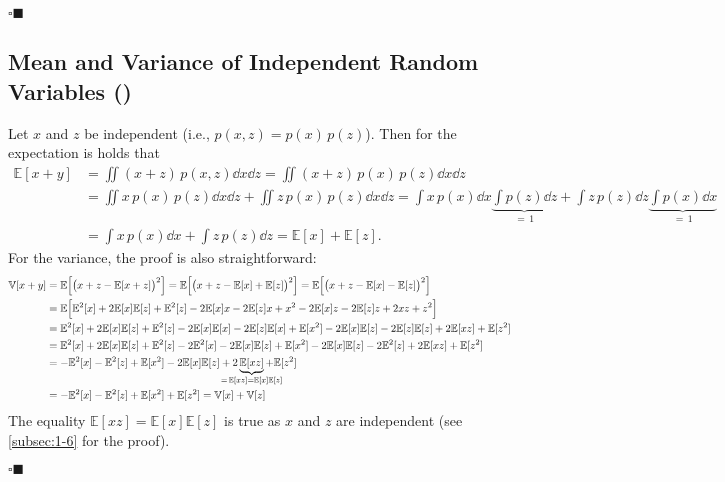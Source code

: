 \documentclass[11pt, a4paper]{scrartcl}
\newcommand{\E}{\mathbb{E}}
\newcommand{\Var}{\mathbb{V}}
\newcommand{\qedeot}{\hfill\(\square\blacksquare\)}
\newcommand{\diffstar}{\texorpdfstring{\raisebox{-1pt}{\resizebox{!}{8pt}{\(\star\)}}}{*}}
\newcommand{\onestar}  {(\diffstar)}
\begin{document}
			\qedeot

		\subsection{Mean and Variance of Independent Random Variables  \onestar}
			Let \(x\) and \(z\) be independent (i.e., \( p(x, z) = p(x) \, p(z) \)). Then for the expectation is holds that
			\begin{align}
				\E[x + y]
					&= \iint\! (x + z) \, p(x, z) \dd{x} \dd{z}
					 = \iint\! (x + z) \, p(x) \, p(z) \dd{x} \dd{z} \\
					&= \iint\! x \, p(x) \, p(z) \dd{x} \dd{z} + \iint\! z \, p(x) \, p(z) \dd{x} \dd{z}
					 = \int\! x \, p(x) \dd{x} \underbrace{\int\! p(z) \dd{z}}_{=\, 1} + \int\! z \, p(z) \dd{z} \underbrace{\int\! p(x) \dd{x}}_{=\, 1} \\
					&= \int\! x \, p(x) \dd{x} + \int\! z \, p(z) \dd{z}
					 = \E[x] + \E[z].
			\end{align}
			For the variance, the proof is also straightforward:
			\begin{align}
				\Var[x + y]
					&= \E\Big[ \big( x + z - \E[x + z] \big)^2 \Big]
					 = \E\Big[ \big( x + z - \E[x] + \E[z] \big)^2 \Big]
					 = \E\Big[ \big( x + z - \E[x] - \E[z] \big)^2 \Big] \\
					&= \E\Big[ \E^2[x] + 2 \E[x] \E[z] + \E^2[z] - 2 \E[x] x - 2 \E[z] x + x^2 - 2 \E[x] z - 2 \E[z] z + 2 x z + z^2 \Big] \\
					&= \E^2[x] + 2 \E[x] \E[z] + \E^2[z] - 2 \E[x] \E[x] - 2 \E[z] \E[x] + \E[x^2] - 2 \E[x] \E[z] - 2 \E[z] \E[z] + 2 \E[xz] + \E[z^2] \\
					&= \E^2[x] + 2 \E[x] \E[z] + \E^2[z] - 2 \E^2[x] - 2 \E[x] \E[z] + \E[x^2] - 2 \E[x] \E[z] - 2 \E^2[z] + 2 \E[xz] + \E[z^2] \\
					&= -\E^2[x] - \E^2[z] + \E[x^2] - 2 \E[x] \E[z] + 2 \underbrace{\E[xz]}_{\mathclap{=\, \E[xz] = \E[x] \E[z]}} + \E[z^2] \\
					&= -\E^2[x] - \E^2[z] + \E[x^2] + \E[z^2]
					 = \Var[x] + \Var[z]
			\end{align}
			The equality \( \E[xz] = \E[x] \E[z] \) is true as \(x\) and \(z\) are independent (see \autoref{subsec:1-6} for the proof).

			\qedeot
\end{document}
